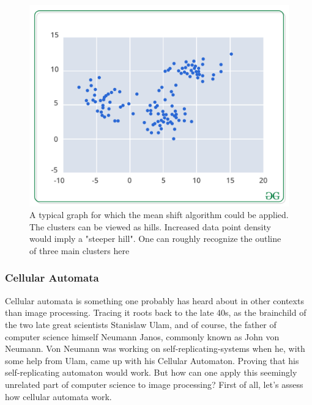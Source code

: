 \documentclass[twoside,a4paper,article]{combine}
\begin{document}
\begin{figure}[H]
    \centering
    \includegraphics[width=0.75\linewidth]{scattergraph.png}
    \caption{A typical graph for which the mean shift algorithm could be applied. The clusters can be viewed as hills. Increased data point density would imply a "steeper hill". One can roughly recognize the outline of three main clusters here}
    \label{fig:enter-label}
\end{figure}

\subsubsection{Cellular Automata}
Cellular automata is something one probably has heard about in other contexts than image processing. Tracing it roots back to the late 40s, as the brainchild of the two late great scientists Stanislaw Ulam, and of course, the father of computer science himself Neumann Janos, commonly known as John von Neumann. Von Neumann was working on self-replicating-systems when he, with some help from Ulam, came up with his Cellular Automaton. Proving that his self-replicating automaton would work. But how can one apply this seemingly unrelated part of computer science to image processing?  First of all, let's assess how cellular automata work.
\end{document}
